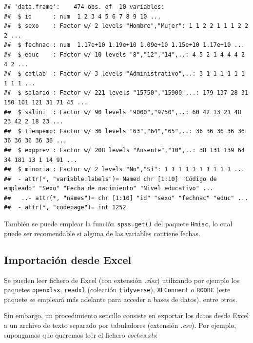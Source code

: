 \documentclass[
]{book}
\theoremstyle{break}
\theoremstyle{nonumberplain}
\begin{document}
\begin{verbatim}
## 'data.frame':    474 obs. of  10 variables:
##  $ id      : num  1 2 3 4 5 6 7 8 9 10 ...
##  $ sexo    : Factor w/ 2 levels "Hombre","Mujer": 1 1 2 2 1 1 1 2 2 2 ...
##  $ fechnac : num  1.17e+10 1.19e+10 1.09e+10 1.15e+10 1.17e+10 ...
##  $ educ    : Factor w/ 10 levels "8","12","14",..: 4 5 2 1 4 4 4 2 4 2 ...
##  $ catlab  : Factor w/ 3 levels "Administrativo",..: 3 1 1 1 1 1 1 1 1 1 ...
##  $ salario : Factor w/ 221 levels "15750","15900",..: 179 137 28 31 150 101 121 31 71 45 ...
##  $ salini  : Factor w/ 90 levels "9000","9750",..: 60 42 13 21 48 23 42 2 18 23 ...
##  $ tiempemp: Factor w/ 36 levels "63","64","65",..: 36 36 36 36 36 36 36 36 36 36 ...
##  $ expprev : Factor w/ 208 levels "Ausente","10",..: 38 131 139 64 34 181 13 1 14 91 ...
##  $ minoria : Factor w/ 2 levels "No","Sí": 1 1 1 1 1 1 1 1 1 1 ...
##  - attr(*, "variable.labels")= Named chr [1:10] "Código de empleado" "Sexo" "Fecha de nacimiento" "Nivel educativo" ...
##   ..- attr(*, "names")= chr [1:10] "id" "sexo" "fechnac" "educ" ...
##  - attr(*, "codepage")= int 1252
\end{verbatim}

También se puede emplear la función \texttt{spss.get()} del paquete \texttt{Hmisc}, lo cual puede ser recomendable si alguna de las variables contiene fechas.

\hypertarget{datos-excel}{%
\subsection{Importación desde Excel}\label{datos-excel}}

Se pueden leer fichero de Excel (con extensión \emph{.xlsx}) utilizando por ejemplo los paquetes \href{https://cran.r-project.org/web/packages/openxlsx/index.html}{\texttt{openxlsx}}, \href{https://readxl.tidyverse.org}{\texttt{readxl}} (colección \href{https://www.tidyverse.org/}{\texttt{tidyverse}}), \texttt{XLConnect} o
\href{https://cran.r-project.org/web/packages/RODBC/index.html}{\texttt{RODBC}} (este paquete se empleará más adelante para acceder a bases de datos),
entre otros.

Sin embargo, un procedimiento sencillo consiste en exportar los datos desde Excel a un archivo de texto separado por tabuladores (extensión \emph{.csv}).
Por ejemplo, supongamos que queremos leer el fichero \emph{coches.xls}:
\end{document}
